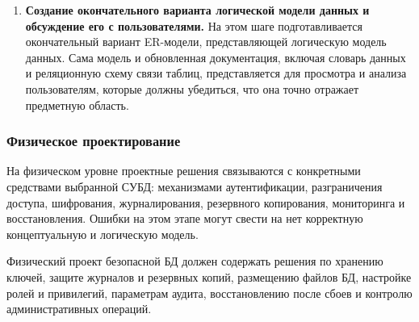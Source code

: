 \begin{enumerate}
\begin{itemize}
            \item ограничения для значений атрибутов. Определяются допустимые значения для атрибутов;

            \item целостность сущностей. Она достигается, если первичный ключ сущности не содержит Null-значений;

            \item ссылочная целостность. Она понимается так, что значение внешнего ключа должно обязательно
            присутствовать в первичном ключе одной из строк таблицы для родительской сущности;

            \item ограничения, накладываемые бизнес-правилами. Например, в случае с проектом БАНК может быть
            принято правило, запрещающее клиенту распоряжаться, скажем, более чем тремя счетами.
        \end{itemize}

    Сведения обо всех установленных ограничениях целостности данных помещаются в словарь данных.

    \item \textbf{Создание окончательного варианта логической модели данных и обсуждение его с пользователями.}
        На этом шаге подготавливается окончательный вариант ER-модели, представляющей логическую модель данных.
        Сама модель и обновленная документация, включая словарь данных и реляционную схему связи таблиц,
        представляется для просмотра и анализа пользователям, которые должны убедиться, что она точно
        отражает предметную область.
\end{enumerate}

\subsubsection{Физическое проектирование}

На физическом уровне проектные решения связываются с конкретными средствами выбранной СУБД: механизмами
аутентификации, разграничения доступа, шифрования, журналирования, резервного копирования, мониторинга и
восстановления. Ошибки на этом этапе могут свести на нет корректную концептуальную и логическую модель.

Физический проект безопасной БД должен содержать решения по хранению ключей, защите журналов и резервных копий,
размещению файлов БД, настройке ролей и привилегий, параметрам аудита, восстановлению после сбоев и контролю
административных операций.

